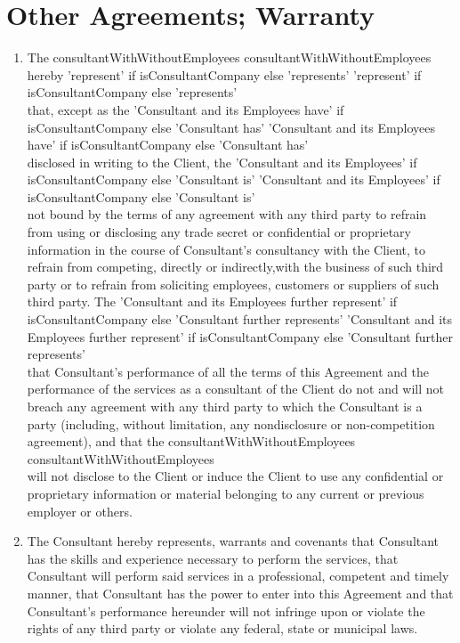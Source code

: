 \documentclass[8pt]{article}
\makeatletter
\edef\history{ }
\newcommand{\VAR}[1]{{\color{blue} #1}\g@addto@macro\history{#1\\}}
\makeatother
\begin{document}
\section{Other Agreements; Warranty}
\begin{enumerate}
    \item The \VAR{ consultantWithWithoutEmployees } hereby
    \VAR{ 'represent' if isConsultantCompany else 'represents'}
    that, except as the
    \VAR{ 'Consultant and its Employees have' if isConsultantCompany else 'Consultant has' }
    disclosed in writing to the Client, the
    \VAR{ 'Consultant and its Employees' if isConsultantCompany else 'Consultant is' }
    not bound by the terms of any agreement with any third party to refrain from using or disclosing any trade secret or confidential or proprietary information in the course of Consultant's consultancy with the Client, to refrain from competing, directly or indirectly,with the business of such third party or to refrain from soliciting employees, customers or suppliers of such third party. The
    \VAR{ 'Consultant and its Employees further represent' if isConsultantCompany else 'Consultant further represents' }
    that Consultant's performance of all the terms of this Agreement and the performance of the services as a consultant of the Client do not and will not breach any agreement with any third party to which the Consultant is a party (including, without limitation, any nondisclosure or non-competition agreement), and that the \VAR{consultantWithWithoutEmployees} will not disclose to the Client or induce the Client to use any confidential or proprietary information or material belonging to any current or previous employer or others.
    \item The Consultant hereby represents, warrants and covenants that Consultant has the skills and experience necessary to perform the services, that Consultant will perform said services in a professional, competent and timely manner, that Consultant has the power to enter into this Agreement and that Consultant's performance hereunder will not infringe upon or violate the rights of any third party or violate any federal, state or municipal laws.
\end{enumerate}
\end{document}
